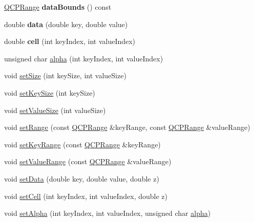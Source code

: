\begin{DoxyCompactItemize}
\item 
\mbox{\label{class_q_c_p_color_map_data_ab7620248272c5ddd9a3f877f07179f6d}} 
\hyperlink{class_q_c_p_range}{Q\+C\+P\+Range} {\bfseries data\+Bounds} () const
\item 
\mbox{\label{class_q_c_p_color_map_data_a2c33807b008cdb9e1394245c294c0eaf}} 
double {\bfseries data} (double key, double value)
\item 
\mbox{\label{class_q_c_p_color_map_data_af51ecd21f347adbf87b4cce4e1f5cbd6}} 
double {\bfseries cell} (int key\+Index, int value\+Index)
\item 
unsigned char \hyperlink{class_q_c_p_color_map_data_a4f7e6b7a97017400cbbd46f0660e68ea}{alpha} (int key\+Index, int value\+Index)
\item 
void \hyperlink{class_q_c_p_color_map_data_a0d9ff35c299d0478b682bfbcdd9c097e}{set\+Size} (int key\+Size, int value\+Size)
\item 
void \hyperlink{class_q_c_p_color_map_data_ac7ef70e383aface34b44dbde49234b6b}{set\+Key\+Size} (int key\+Size)
\item 
void \hyperlink{class_q_c_p_color_map_data_a0893c9e3914513048b45e3429ffd16f2}{set\+Value\+Size} (int value\+Size)
\item 
void \hyperlink{class_q_c_p_color_map_data_aad9c1c7c703c1339489fc730517c83d4}{set\+Range} (const \hyperlink{class_q_c_p_range}{Q\+C\+P\+Range} \&key\+Range, const \hyperlink{class_q_c_p_range}{Q\+C\+P\+Range} \&value\+Range)
\item 
void \hyperlink{class_q_c_p_color_map_data_a0738c485f3c9df9ea1241b7a8bb6a86e}{set\+Key\+Range} (const \hyperlink{class_q_c_p_range}{Q\+C\+P\+Range} \&key\+Range)
\item 
void \hyperlink{class_q_c_p_color_map_data_ada1b2680ba96a5f4175b6d341cf75d23}{set\+Value\+Range} (const \hyperlink{class_q_c_p_range}{Q\+C\+P\+Range} \&value\+Range)
\item 
void \hyperlink{class_q_c_p_color_map_data_afd2083ccfd6987ec94aa7ef8e91ca39a}{set\+Data} (double key, double value, double z)
\item 
void \hyperlink{class_q_c_p_color_map_data_a8e75eaf8746596319032a93f3d2d0683}{set\+Cell} (int key\+Index, int value\+Index, double z)
\item 
void \hyperlink{class_q_c_p_color_map_data_aaf7de5b34c58f38d8f4c1ceb064a876c}{set\+Alpha} (int key\+Index, int value\+Index, unsigned char \hyperlink{class_q_c_p_color_map_data_a4f7e6b7a97017400cbbd46f0660e68ea}{alpha})

\end{DoxyCompactItemize}
